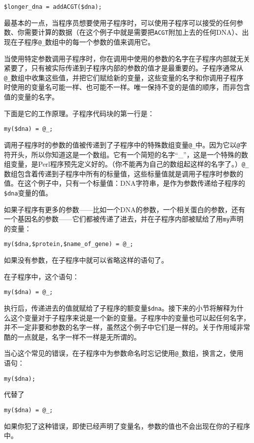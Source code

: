 \begin{lstlisting}
$longer_dna = addACGT($dna);
\end{lstlisting}

最基本的一点，当程序员想要使用子程序时，可以使用子程序可以接受的任何参数、你需要计算的数据（在这个例子中就是需要把\verb|ACGT|附加上去的任何DNA）、出现在子程序\verb|@_|数组中的每一个参数的值来调用它。

当使用特定参数调用子程序时，你在调用中使用的参数的名字在子程序内部就无关紧要了，只有被实际传递到子程序内部的参数的值才是最重要的。子程序通常从\verb|@_|数组中收集这些值，并把它们赋给新的变量，这些变量的名字和你调用子程序时使用的变量名可能一样、也可能不一样。唯一保持不变的是值的顺序，而非包含值的变量的名字。

下面是它的工作原理。子程序代码块的第一行是：

\begin{lstlisting}
my($dna) = @_; 
\end{lstlisting}

调用子程序时的参数的值被传递到了子程序中的特殊数组变量\verb|@_|中。因为它以\verb|@|字符开头，所以你知道这是一个数组。它有一个简短的名字“\_”，这是一个特殊的数组变量，是Perl程序预先定义好的。（你不能再为自己的数组起这样的名字了。）\verb|@_|数组包含着传递到子程序中所有的标量值，这些标量值就是调用子程序时参数的值。在这个例子中，只有一个标量值：DNA字符串，是作为参数传递给子程序的\verb|$dna|变量的值。

如果子程序有更多的参数——比如一个DNA的参数，一个相关蛋白的参数，还有一个基因名的参数——它们都被传递了进去，并在子程序内部被赋给了用\verb|my|声明的变量：

\begin{lstlisting}
my($dna,$protein,$name_of_gene) = @_;
\end{lstlisting}

如果没有参数，在子程序中就可以省略这样的语句了。

在子程序中，这个语句：

\begin{lstlisting}
my($dna) = @_;
\end{lstlisting}

执行后，传递进去的值就赋给了子程序的额变量\verb|$dna|。接下来的小节将解释为什么这个变量对于子程序来说是一个新的变量。子程序中的变量也可以起任何名字，并不一定非要和参数的名字一样，虽然这个例子中它们是一样的。关于作用域非常酷的一点就是，名字一样不一样是无所谓的。

\begin{adjustwidth}{2cm}{2cm}
\noindent
当心这个常见的错误，在子程序中为参数命名时忘记使用\verb|@_|数组，换言之，使用语句：
  \begin{lstlisting}
my($dna);
  \end{lstlisting}
  代替了
  \begin{lstlisting}
my($dna) = @_;
  \end{lstlisting}
  如果你犯了这种错误，即使已经声明了变量名，参数的值也不会出现在你的子程序中。
\end{adjustwidth}

